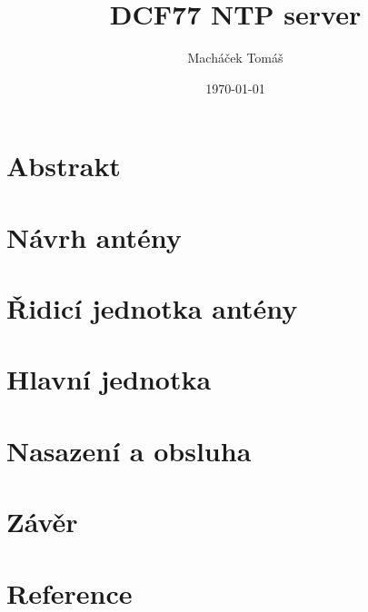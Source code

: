 \documentclass[12pt]{report}
\title{DCF77 NTP server}
\author{Macháček Tomáš}
\date{\today}
\begin{document}




\tableofcontents

\chapter{Abstrakt}


\chapter{Návrh antény}


\chapter{Řidicí jednotka antény}


\chapter{Hlavní jednotka}


\chapter{Nasazení a obsluha}


\chapter{Závěr}


\newpage

\chapter{Reference}

\makeatletter
\renewcommand{\chapter}{\@gobbletwo}
\makeatother

\printbibliography
\end{document}
